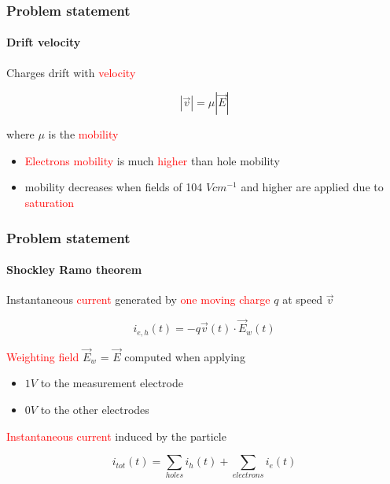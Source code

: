 \documentclass[14pt]{beamer}
\begin{document}
\begin{frame}
  \frametitle{Problem statement}
  \framesubtitle{Drift velocity}

  Charges drift with \textcolor{red}{velocity}

  \[|\vec{v}| = \mu |\vec{E}|\]

  where  $\mu$ is the \textcolor{red}{mobility}

  \begin{itemize}
    \item \textcolor{red}{Electrons mobility} is much \textcolor{red}{higher} than hole mobility
    \item mobility decreases when fields of 104 $V cm^{-1}$ and higher are
    applied due to \textcolor{red}{saturation}

  \end{itemize}
\end{frame}

\begin{frame}
  \frametitle{Problem statement}
  \framesubtitle{Shockley Ramo theorem}

   Instantaneous \textcolor{red}{current} generated	by \textcolor{red}{one moving charge} $q$ at speed $\vec{v}$

		\[i_{e,h}(t) = -q \vec{v}(t) \cdot \vec{E}_w(t)\]

	\textcolor{red}{Weighting field} $\vec{E}_w$ = $\vec{E}$ computed when applying

\begin{itemize}
  \item $1V$ to the measurement electrode
	\item $0V$ to the other electrodes
\end{itemize}

\textcolor{red}{Instantaneous current} induced by the particle

\[i_{tot}(t) = \sum_{holes} i_h(t) + \sum_{electrons} i_e(t)\]
\end{frame}
\end{document}
